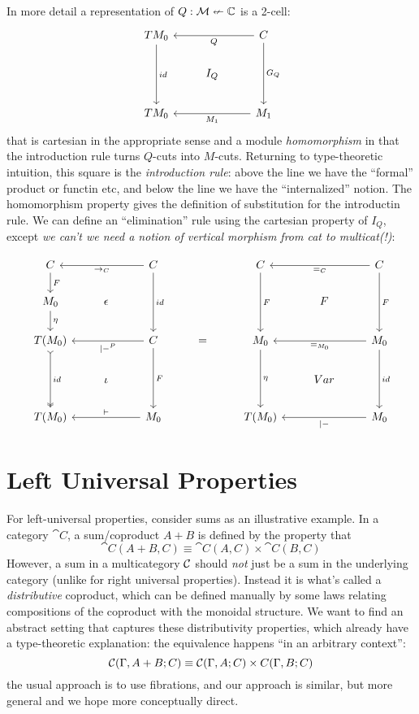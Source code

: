 \documentclass{article}
\begin{document}
In more detail a representation of $Q : \mathcal M \nleftarrow \mathbb C$ is a
2-cell:
  \[
  \begin{tikzcd}
TM_0 \arrow[dd, "id"] &  & C \arrow[dd, "G_Q"] \arrow[ll, "Q"] \\
 & I_Q &  \\
TM_0 &  & M_1 \arrow[ll, "M_1"]
  \end{tikzcd}
  \]
that is cartesian in the appropriate sense and a module
\emph{homomorphism} in that the introduction rule turns $Q$-cuts into
$M$-cuts.
%
Returning to type-theoretic intuition, this square is the
\emph{introduction rule}: above the line we have the ``formal''
product or functin etc, and below the line we have the
``internalized'' notion.
%
The homomorphism property gives the definition of substitution for the
introductin rule.
%
We can define an ``elimination'' rule using the cartesian property of
$I_Q$, except \emph{we can't we need a notion of vertical morphism from cat to multicat(!)}:

\[\begin{tikzcd}
C \arrow[d, "F"] &  & C \arrow[ll, "\to_C"] \arrow[dd, "id"] &  & C \arrow[dd, "F"] &  & C \arrow[dd, "F"] \arrow[ll, "=_C"] \\
M_0 \arrow[d, "\eta"] & \epsilon &  &  &  & F &  \\
T(M_0) \arrow[dd, "id", two heads, tail] &  & C \arrow[ll, "|-^P"] \arrow[dd, "F"] & = & M_0 \arrow[dd, "\eta"] &  & M_0 \arrow[dd, "id"] \arrow[ll, "=_{M_0}"] \\
 & \iota &  &  &  & Var &  \\
T(M_0) &  & M_0 \arrow[ll, "\vdash"'] &  & T(M_0) &  & M_0 \arrow[ll, "|-"]
\end{tikzcd}
\]


\section{Left Universal Properties}

For left-universal properties, consider sums as an illustrative
example.
%
In a category $\cat C$, a sum/coproduct $A + B$ is defined by the property that
\[ \cat C(A + B, C) \equiv \cat C(A,C) \times \cat C(B,C) \]
%
However, a sum in a multicategory $\mathcal C$ should \emph{not} just be
a sum in the underlying category (unlike for right universal
properties).
%
Instead it is what's called a \emph{distributive} coproduct, which can
be defined manually by some laws relating compositions of the
coproduct with the monoidal structure.
%
We want to find an abstract setting that captures these distributivity
properties, which already have a type-theoretic explanation: the
equivalence happens ``in an arbitrary context'':
\[ \mathcal C(\Gamma,A + B; C) \equiv \mathcal C(\Gamma, A; C) \times C(\Gamma,B;C)\]
the usual approach is to use fibrations, and our approach is similar,
but more general and we hope more conceptually direct.
\end{document}
